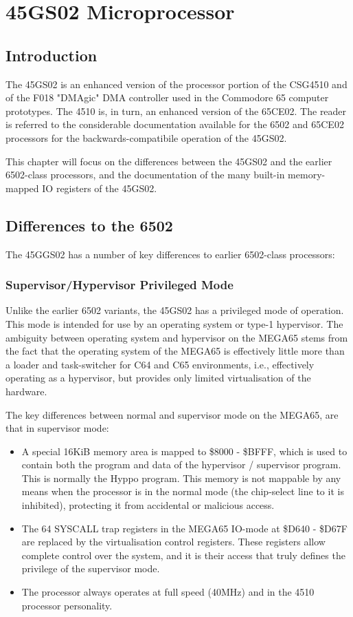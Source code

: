 \chapter{45GS02 Microprocessor}
\label{cha:cpu}
\label{cha:45gs02}
\section{Introduction}

The 45GS02 is an enhanced version of the processor portion of the CSG4510
and of the F018 "DMAgic" DMA controller used in the Commodore 65
computer prototypes.  The 4510 is, in turn,
an enhanced version of the 65CE02.
The reader is referred to
the considerable documentation available for the 6502 and 65CE02 processors
for the backwards-compatibile operation of the 45GS02.

This chapter will
focus on the differences between the 45GS02 and the earlier 6502-class
processors, and the documentation of the many built-in memory-mapped IO
registers of the 45GS02.

\section{Differences to the 6502}

The 45GGS02 has a number of key differences to earlier 6502-class processors:

\subsection{Supervisor/Hypervisor Privileged Mode}

Unlike the earlier 6502 variants, the 45GS02 has a privileged mode of operation.
This mode is intended for use by an operating system or type-1
hypervisor.  The ambiguity between
operating system and hypervisor on the MEGA65 stems from the fact that the operating
system of the MEGA65 is effectively little more than a loader and
task-switcher for C64 and C65
environments, i.e., effectively operating as a hypervisor, but provides
only limited virtualisation
of the hardware.

The key differences between normal and supervisor mode on the MEGA65, are that in
supervisor mode:

\begin{itemize}
\item A special 16KiB memory area is mapped to \$8000 - \$BFFF, which is
 used to contain both
 the program and data of the hypervisor / supervisor program.
 This is normally the Hyppo program.
  This memory is not mappable by any means when the processor is in the
 normal mode (the chip-select
  line to it is inhibited), protecting it from accidental or malicious access.
\item The 64 SYSCALL trap registers in the MEGA65 IO-mode at
\$D640 - \$D67F are replaced by the
  virtualisation control registers.  These registers allow complete
control over the system, and
  it is their access that truly defines the privilege of the supervisor mode.
  \item The processor always operates at full speed (40MHz) and in the
 4510 processor personality.
\end{itemize}

